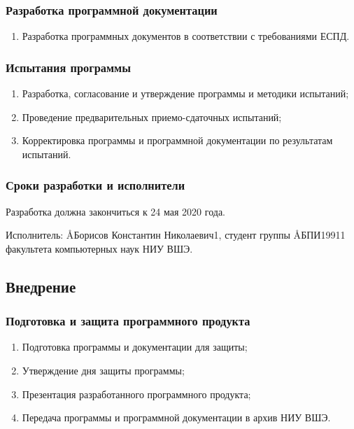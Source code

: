 \documentclass[a4paper,12pt,reqno]{article}
\begin{document}
      \subsubsection*{Разработка программной документации}
      \begin{enumerate}
        \item Разработка программных документов в соответствии с требованиями ЕСПД.
      \end{enumerate}
      \subsubsection*{Испытания программы}
      \begin{enumerate}
        \item Разработка, согласование и утверждение программы и методики испытаний;
        \item Проведение предварительных приемо-сдаточных испытаний;
        \item Корректировка программы и программной документации по результатам испытаний.
      \end{enumerate}
      \subsubsection*{Сроки разработки и исполнители}
      Разработка должна закончиться к 24 мая 2020 года.

      Исполнитель: \AA{Борисов Константин Николаевич}{1}, студент группы \AA{БПИ199}{11} факультета компьютерных наук НИУ ВШЭ.
    \subsection{Внедрение}
      \subsubsection*{Подготовка и защита программного продукта}
      \begin{enumerate}
        \item Подготовка программы и документации для защиты;
        \item Утверждение дня защиты программы;
        \item Презентация разработанного программного продукта;
        \item Передача программы и программной документации в архив НИУ ВШЭ.
      \end{enumerate}

\end{document}
